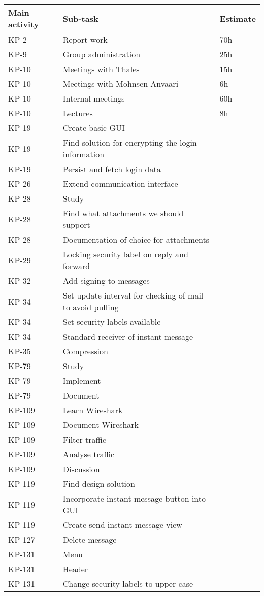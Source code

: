 \begin{table}
\begin{tabularx}{\linewidth}{>{\setlength\hsize{.2\hsize}}X|>{\setlength\hsize{1.5\hsize}}X|>{\setlength\hsize{.1\hsize}}X}
\textbf{Main activity} &  \textbf{Sub-task} & \textbf{Estimate}\\ \hline \hline
KP-2 & Report work & 70h\\ \hline
KP-9 & Group administration & 25h\\ \hline
KP-10 & Meetings with Thales & 15h\\ \hline
KP-10 & Meetings with Mohnsen Anvaari & 6h\\ \hline
KP-10 & Internal meetings & 60h\\ \hline
KP-10 & Lectures & 8h\\ \hline
KP-19	& Create basic GUI & \\ \hline
KP-19	& Find solution for encrypting the login information & \\ \hline
KP-19	& Persist and fetch login data & \\ \hline
KP-26	& Extend communication interface & \\ \hline
KP-28	& Study & \\ \hline
KP-28	& Find what attachments we should support & \\ \hline
KP-28	& Documentation of choice for attachments & \\ \hline
KP-29	& Locking security label on reply and forward & \\ \hline
KP-32	& Add signing to messages & \\ \hline
KP-34	& Set update interval for checking of mail to avoid pulling & \\ \hline
KP-34	& Set security labels available & \\ \hline
KP-34	& Standard receiver of instant message & \\ \hline
KP-35	& Compression & \\ \hline
KP-79	& Study & \\ \hline
KP-79	& Implement & \\ \hline
KP-79	& Document & \\ \hline
KP-109 & Learn Wireshark & \\ \hline
KP-109 & Document Wireshark & \\ \hline
KP-109 & Filter traffic & \\ \hline
KP-109 & Analyse traffic & \\ \hline
KP-109 & Discussion & \\ \hline
KP-119 & Find design solution & \\ \hline
KP-119 & Incorporate instant message button into GUI & \\ \hline
KP-119 & Create send instant message view & \\ \hline
KP-127 & Delete message & \\ \hline
KP-131 & Menu & \\ \hline
KP-131 & Header & \\ \hline
KP-131 & Change security labels to upper case & \\ \hline




\end{tabularx}
\end{table}
